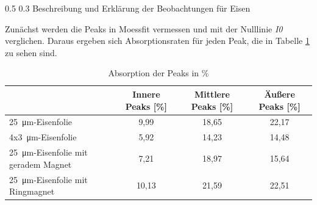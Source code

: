 \documentclass[german, %
parskip=full, %
bibliography=totoc, %
]{scrartcl}
\makeatletter
\renewcommand\subsection{\@startsection 
   {subsection}{2}{0mm}%
   {0.5\baselineskip}%
   {0.3\baselineskip}%
   {\bfseries\sffamily\large}%
   }
\makeatother
\begin{document}
\subsection{Beschreibung und Erklärung der Beobachtungen für Eisen}

Zunächst werden die Peaks in Moessfit vermessen und mit der Nulllinie \textit{I0} verglichen. Daraus ergeben sich Absorptionsraten für jeden Peak, die in Tabelle \ref{tab:absorption} zu sehen sind.

\begin{table}[ht]
\centering
\begin{tabular}[h]{l|c|c|c}
& Innere Peaks [\%] & Mittlere Peaks [\%] & Äußere Peaks [\%] \\ \hline
\SI{25}{\micro\meter}-Eisenfolie & 9,99 & 18,65 & 22,17 \\ \hline
4x\SI{3}{\micro\meter}-Eisenfolie & 5,92 & 14,23 & 14,48 \\ \hline
\SI{25}{\micro\meter}-Eisenfolie mit geradem Magnet & 7,21 & 18,97 & 15,64 \\ \hline
\SI{25}{\micro\meter}-Eisenfolie mit Ringmagnet & 10,13 & 21,59 & 22,51
\end{tabular}
\caption{Absorption der Peaks in \%}
\label{tab:absorption}
\end{table}
\end{document}
